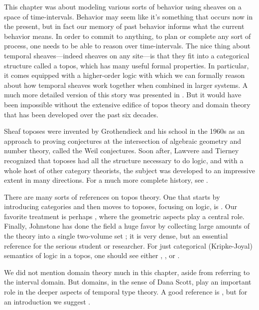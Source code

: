 \documentclass[7Sketches]{subfiles}
\begin{document}
This chapter was about modeling various sorts of behavior using sheaves on a space of time-intervals. Behavior may seem like it's something that occurs now in the present, but in fact our memory of past behavior informs what the current behavior means. In order to commit to anything, to plan or complete any sort of process, one needs to be able to reason over time-intervals. The nice thing about temporal sheaves---indeed sheaves on any site---is that they fit into a categorical structure called a topos, which has many useful formal properties. In particular, it comes equipped with a higher-order logic with which we can formally reason about how temporal sheaves work together when combined in larger systems. A much more detailed version of this story was presented in \cite{Schultz.Spivak:2017a}.\nocite{Spivak.Vasilakopoulou.Schultz:2016a} But it would have been impossible without the extensive edifice of topos theory and domain theory that has been developed over the past six decades.

Sheaf toposes were invented by Grothendieck and his school in the 1960s \cite{Artin.Grothendieck.Verdier:1971a} as an approach to proving conjectures at the intersection of algebraic geometry and number theory, called the Weil conjectures. Soon after, Lawvere and Tierney recognized that toposes had all the structure necessary to do logic, and with a whole host of other category theorists, the subject was developed to an impressive extent in many directions. For a much more complete history, see \cite{Mclarty:1990a}.

There are many sorts of references on topos theory. One that starts by introducing categories and then moves to toposes, focusing on logic, is \cite{Mclarty:1992a}. Our favorite treatment is perhaps \cite{MacLane.Moerdijk:1992a}, where the geometric aspects play a central role. Finally, Johnstone has done the field a huge favor by collecting large amounts of the theory into a single two-volume set \cite{Johnstone:2002a}; it is very dense, but an essential reference for the serious student or researcher. For just categorical (Kripke-Joyal) semantics of logic in a topos, one should see either \cite{MacLane.Moerdijk:1992a}, \cite{Jacobs:1999a}, or \cite{Lambek.Scott:1988a}.

We did not mention domain theory much in this chapter, aside from referring to the interval domain. But domains, in the sense of Dana Scott, play an important role in the deeper aspects of temporal type theory. A good reference is \cite{Gierz.Keimel.Lawson.Mislove.Scott:2003a}, but for an introduction we suggest \cite{Abramsky.Jung:1994a}.
\end{document}
